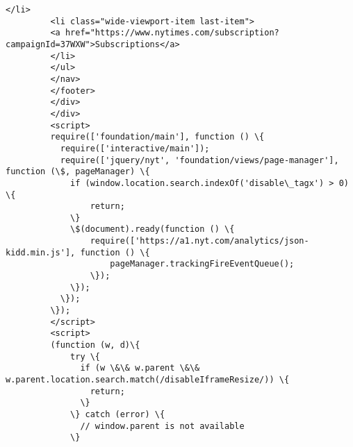 \documentclass[11pt]{article}
\begin{document}
\begin{Verbatim}[commandchars=\\\{\}]
         </li>
         <li class="wide-viewport-item last-item">
         <a href="https://www.nytimes.com/subscription?campaignId=37WXW">Subscriptions</a>
         </li>
         </ul>
         </nav>
         </footer>
         </div>
         </div>
         <script>
         require(['foundation/main'], function () \{
           require(['interactive/main']);
           require(['jquery/nyt', 'foundation/views/page-manager'], function (\$, pageManager) \{
             if (window.location.search.indexOf('disable\_tagx') > 0) \{
                 return;
             \}
             \$(document).ready(function () \{
                 require(['https://a1.nyt.com/analytics/json-kidd.min.js'], function () \{
                     pageManager.trackingFireEventQueue();
                 \});
             \});
           \});
         \});
         </script>
         <script>
         (function (w, d)\{
             try \{
               if (w \&\& w.parent \&\& w.parent.location.search.match(/disableIframeResize/)) \{
                 return;
               \}
             \} catch (error) \{
               // window.parent is not available
             \}
         

\end{Verbatim}
\end{document}
